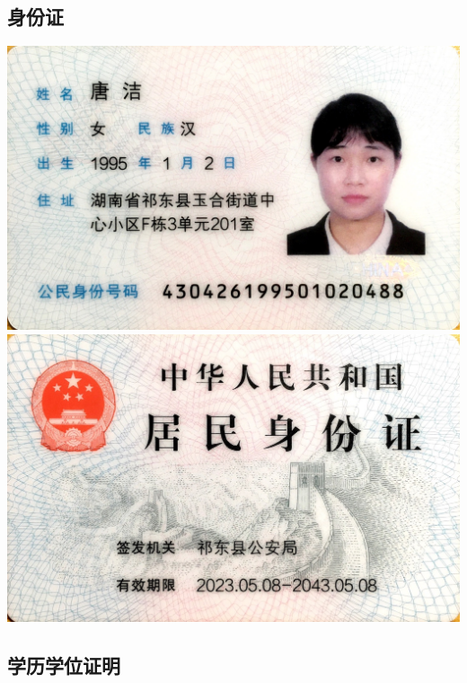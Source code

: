 \documentclass[UFT8]{ctexart}%
\begin{document}
\subsection{身份证}
\begin{center}
  \includegraphics[scale=0.12]{figs/身份证1.jpg }
  \includegraphics[scale=0.12]{figs/身份证2.jpg }
\end{center}

\subsection{学历学位证明}


%
%
%
%
%
%
\end{document}
